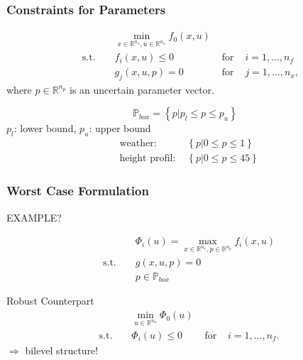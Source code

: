 

\begin{frame}
\frametitle{Constraints for Parameters}

\begin{block}
	
\begin{align*}
 &&& \min_{x\in \mathbb{R}^{n_{x}}, u\in \mathbb{R}^{n_{u}}}  f_{0}(x, u)\\
& \text{ s.t. } &&  f_{i}(x,u) \leq 0 & \text{ for } & i=1,\ldots,n_{f}\\
&&&  g_{j}(x,u,p)=0 & \text{ for } & j=1,\ldots,n_{x},
\end{align*}
where $p\in \mathbb{R}^{n_{p}}$ is an uncertain parameter vector.

\end{block}


\begin{block}

\begin{equation*}
\mathbb{P}_{box}=\left\{\left. p \right| p_{l}\leq p \leq p_{u}\right\}
\end{equation*}
$p_{l}$: lower bound, $p_{u}$: upper bound
\begin{align*}
& \text{weather: }  & \left\{\left. p \right| 0\leq p\leq 1\right\} \\
& \text{height profil: } & \left\{\left. p \right| 0\leq p\leq 45\right\}
\end{align*}


\end{block}


\end{frame}


\begin{frame}
\frametitle{Worst Case Formulation}

EXAMPLE?

\begin{align*}
&&&\Phi_{i}(u)=\max_{x\in \mathbb{R}^{n_{x}}, p\in \mathbb{R}^{n_{p}}} f_{i}(x,u)\\
	& \text{s.t. } && g(x,u,p)=0\\
	&&& p\in\mathbb{P}_{box}
\end{align*}

\begin{block}{Robust Counterpart}
\begin{align*}
&&&\min_{u\in\mathbb{R}^{n_{u}}} \Phi_{0}(u)\\
&\text{s.t. } &&\Phi_{i}(u)\leq 0 & \text{ for } & i=1,\ldots,n_{f}.
\end{align*}
$\Rightarrow$ bilevel structure!
\end{block}

\end{frame}

